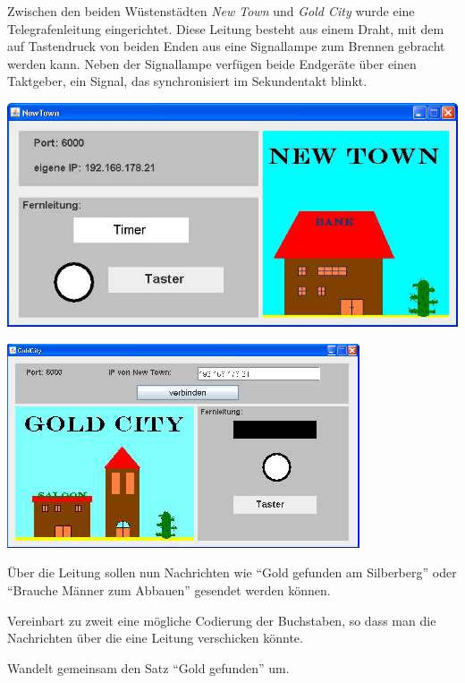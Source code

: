 \documentclass[10pt, a4paper]{arbeitsblatt}
\begin{document}
\ReiheTitel

Zwischen den beiden Wüstenstädten \emph{New Town} und \emph{Gold City} wurde eine Telegrafenleitung eingerichtet. Diese Leitung besteht aus einem Draht, mit dem auf Tastendruck von beiden Enden aus eine Signallampe zum Brennen gebracht werden kann. Neben der Signallampe verfügen beide Endgeräte über einen Taktgeber, ein Signal, das synchronisiert im Sekundentakt blinkt.

\begin{multicols}{2}\centering
	\vspace*{2mm}
	\includegraphics[width=.8\columnwidth]{Q2-GK-AB.II.1-Abb_New Town.png}

	\includegraphics[width=.8\columnwidth]{Q2-GK-AB.II.1-Abb_Gold City.png}
\end{multicols}

\begin{aufgabe}
	Über die Leitung sollen nun Nachrichten wie \enquote{Gold gefunden am Silberberg} oder \enquote{Brauche Männer zum Abbauen} gesendet werden können.

	\begin{teilaufgaben}
		\teilaufgabe Vereinbart zu zweit eine mögliche Codierung der Buchstaben, so dass man die Nachrichten über die eine Leitung verschicken könnte.

		\teilaufgabe Wandelt gemeinsam den Satz \enquote{Gold gefunden} um.
	\end{teilaufgaben}
\end{aufgabe}
\end{document}
